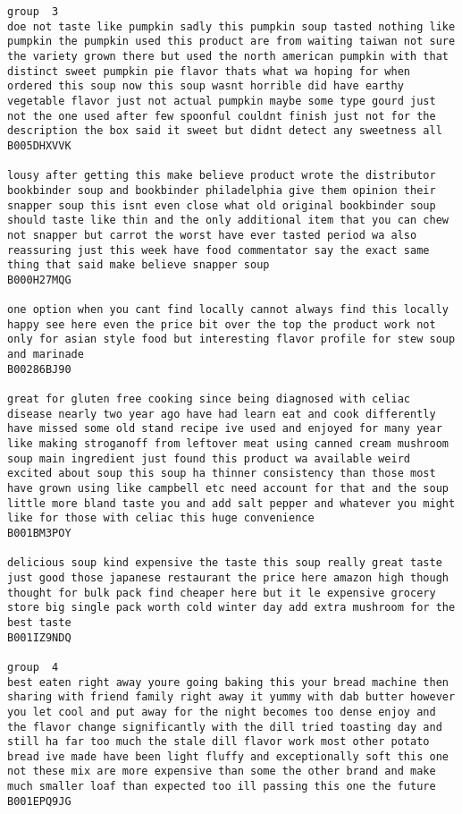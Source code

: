 \documentclass[11pt]{article}
\begin{document}
\begin{Verbatim}[commandchars=\\\{\}]
group  3
doe not taste like pumpkin sadly this pumpkin soup tasted nothing like pumpkin the pumpkin used this product are from waiting taiwan not sure the variety grown there but used the north american pumpkin with that distinct sweet pumpkin pie flavor thats what wa hoping for when ordered this soup now this soup wasnt horrible did have earthy vegetable flavor just not actual pumpkin maybe some type gourd just not the one used after few spoonful couldnt finish just not for the description the box said it sweet but didnt detect any sweetness all
B005DHXVVK

lousy after getting this make believe product wrote the distributor bookbinder soup and bookbinder philadelphia give them opinion their snapper soup this isnt even close what old original bookbinder soup should taste like thin and the only additional item that you can chew not snapper but carrot the worst have ever tasted period wa also reassuring just this week have food commentator say the exact same thing that said make believe snapper soup
B000H27MQG

one option when you cant find locally cannot always find this locally happy see here even the price bit over the top the product work not only for asian style food but interesting flavor profile for stew soup and marinade
B00286BJ90

great for gluten free cooking since being diagnosed with celiac disease nearly two year ago have had learn eat and cook differently have missed some old stand recipe ive used and enjoyed for many year like making stroganoff from leftover meat using canned cream mushroom soup main ingredient just found this product wa available weird excited about soup this soup ha thinner consistency than those most have grown using like campbell etc need account for that and the soup little more bland taste you and add salt pepper and whatever you might like for those with celiac this huge convenience
B001BM3POY

delicious soup kind expensive the taste this soup really great taste just good those japanese restaurant the price here amazon high though thought for bulk pack find cheaper here but it le expensive grocery store big single pack worth cold winter day add extra mushroom for the best taste
B001IZ9NDQ

group  4
best eaten right away youre going baking this your bread machine then sharing with friend family right away it yummy with dab butter however you let cool and put away for the night becomes too dense enjoy and the flavor change significantly with the dill tried toasting day and still ha far too much the stale dill flavor work most other potato bread ive made have been light fluffy and exceptionally soft this one not these mix are more expensive than some the other brand and make much smaller loaf than expected too ill passing this one the future
B001EPQ9JG


\end{Verbatim}
\end{document}
